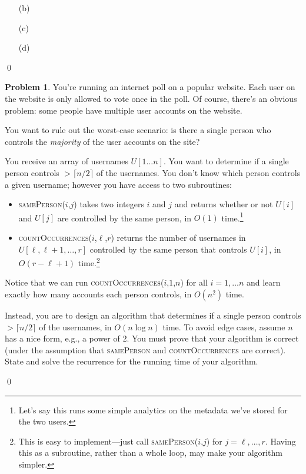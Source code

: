 \documentclass[12pt]{article}
\theoremstyle{definition}
\newtheorem{question}{Problem}
\newenvironment{solution}{\bigskip\noindent{\it Solution.}  \ignorespaces}{\hfill\qed}
\begin{document}
\begin{solution}
\begin{enumerate}

\item[(b)]

\item[(c)]

\item[(d)]
\end{enumerate}
\end{solution}


\newpage
\begin{question}\label{majority}
  You're running an internet poll on a popular website.  Each user on the website is only allowed to vote once in the poll.  Of course, there's an obvious problem: some people have multiple user accounts on the website.

  You want to rule out the worst-case scenario: is there a single person who controls the \emph{majority} of the user accounts on the site?  

  You receive an array of usernames $U[1\ldots n]$.  You want to determine if a single person controls $> \lceil n/2 \rceil$ of the usernames.  You don't know which person controls a given username; however you have access to two subroutines:
  \begin{itemize}
    \item \textsc{samePerson($i$,$j$)} takes two integers $i$ and $j$ and returns whether or not $U[i]$ and $U[j]$ are controlled by the same person, in $O(1)$ time.\footnote{Let's say this runs some simple analytics on the metadata we've stored for the two users.}
    \item \textsc{countOccurrences($i$,$\ell$,$r$)} returns the number of usernames in $U[\ell, \ell+1,\ldots, r]$ controlled by the same person that controls $U[i]$, in $O(r - \ell + 1)$ time.\footnote{This is easy to implement---just call \textsc{samePerson($i$,$j$)} for $j = \ell, \ldots, r$.  Having this as a subroutine, rather than a whole loop, may make your algorithm simpler.}
  \end{itemize}

  Notice that we can run \textsc{countOccurrences($i$,$1$,$n$)} for all $i = 1,\ldots n$ and learn exactly how many accounts each person controls, in $O(n^2)$ time.

  Instead, you are to design an algorithm that determines if a single person controls $> \lceil n/2 \rceil$ of the usernames, in $O(n\log n)$ time.
To avoid edge cases, assume $n$ has a nice form, e.g., a power of $2$.
You must
prove that your algorithm is correct (under the assumption that \textsc{samePerson} and \textsc{countOccurrences} are correct). 
State and solve the recurrence for the running time of your algorithm.
\end{question}
\begin{solution}
\end{solution}
\end{document}
